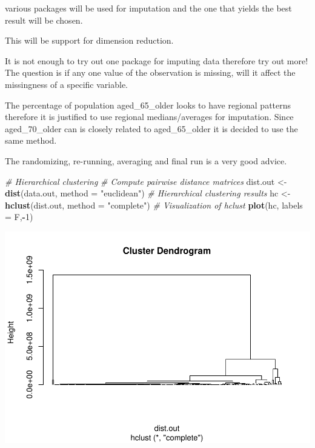 \documentclass[
]{article}
\newenvironment{Shaded}{\begin{snugshade}}{\end{snugshade}}
\newcommand{\CommentTok}[1]{\textcolor[rgb]{0.56,0.35,0.01}{\textit{#1}}}
\newcommand{\DataTypeTok}[1]{\textcolor[rgb]{0.13,0.29,0.53}{#1}}
\newcommand{\DecValTok}[1]{\textcolor[rgb]{0.00,0.00,0.81}{#1}}
\newcommand{\KeywordTok}[1]{\textcolor[rgb]{0.13,0.29,0.53}{\textbf{#1}}}
\newcommand{\NormalTok}[1]{#1}
\newcommand{\OperatorTok}[1]{\textcolor[rgb]{0.81,0.36,0.00}{\textbf{#1}}}
\newcommand{\StringTok}[1]{\textcolor[rgb]{0.31,0.60,0.02}{#1}}
\begin{document}
various packages will be used for imputation and the one that yields the best result will be chosen.

This will be support for dimension reduction.

It is not enough to try out one package for imputing data therefore try out more!
The question is if any one value of the observation is missing, will it affect the missingness of a specific variable.

The percentage of population aged\_65\_older looks to have regional patterns therefore it is justified to use regional medians/averages for imputation. Since aged\_70\_older can is closely related to aged\_65\_older it is decided to use the same method.

The randomizing, re-running, averaging and final run is a very good advice.

\begin{Shaded}
\begin{Highlighting}[]
\CommentTok{# Hierarchical clustering}
\CommentTok{# Compute pairwise distance matrices}
\NormalTok{dist.out <-}\StringTok{ }\KeywordTok{dist}\NormalTok{(data.out,}
                 \DataTypeTok{method =} \StringTok{"euclidean"}\NormalTok{)}
\CommentTok{# Hierarchical clustering results}
\NormalTok{hc <-}\StringTok{ }\KeywordTok{hclust}\NormalTok{(dist.out,}
             \DataTypeTok{method =} \StringTok{"complete"}\NormalTok{)}
\CommentTok{# Visualization of hclust}
\KeywordTok{plot}\NormalTok{(hc, }\DataTypeTok{labels =}\NormalTok{ F,}\OperatorTok{-}\DecValTok{1}\NormalTok{)}
\end{Highlighting}
\end{Shaded}

\includegraphics{Assignment1_files/figure-latex/unnamed-chunk-26-1.pdf}
\end{document}
